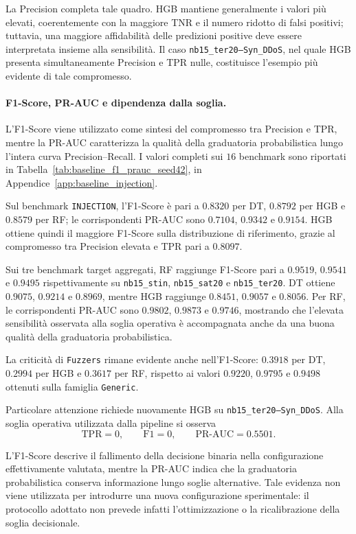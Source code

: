 La Precision completa tale quadro. 
HGB mantiene generalmente i valori più elevati, coerentemente con la maggiore TNR e il numero ridotto di falsi positivi; tuttavia, una maggiore affidabilità delle predizioni positive deve essere interpretata insieme alla sensibilità. 
Il caso \texttt{nb15\_ter20--Syn\_DDoS}, nel quale HGB presenta simultaneamente Precision e TPR nulle, costituisce l'esempio più evidente di tale compromesso.

\paragraph{F1-Score, PR-AUC e dipendenza dalla soglia.}
L'F1-Score viene utilizzato come sintesi del compromesso tra Precision e TPR, mentre la PR-AUC caratterizza la qualità della graduatoria probabilistica lungo l'intera curva Precision--Recall. 
I valori completi sui $16$ benchmark sono riportati in Tabella~\ref{tab:baseline_f1_prauc_seed42}, in Appendice~\ref{app:baseline_injection}.

Sul benchmark \texttt{INJECTION}, l'F1-Score è pari a $0.8320$ per DT, $0.8792$ per HGB e $0.8579$ per RF; le corrispondenti PR-AUC sono $0.7104$, $0.9342$ e $0.9154$. 
HGB ottiene quindi il maggiore F1-Score sulla distribuzione di riferimento, grazie al compromesso tra Precision elevata e TPR pari a $0.8097$.

Sui tre benchmark target aggregati, RF raggiunge F1-Score pari a $0.9519$, $0.9541$ e $0.9495$ rispettivamente su \texttt{nb15\_stin}, \texttt{nb15\_sat20} e \texttt{nb15\_ter20}. 
DT ottiene $0.9075$, $0.9214$ e $0.8969$, mentre HGB raggiunge $0.8451$, $0.9057$ e $0.8056$. 
Per RF, le corrispondenti PR-AUC sono $0.9802$, $0.9873$ e $0.9746$, mostrando che l'elevata sensibilità osservata alla soglia operativa è accompagnata anche da una buona qualità della graduatoria probabilistica.

La criticità di \texttt{Fuzzers} rimane evidente anche nell'F1-Score: $0.3918$ per DT, $0.2994$ per HGB e $0.3617$ per RF, rispetto ai valori $0.9220$, $0.9795$ e $0.9498$ ottenuti sulla famiglia \texttt{Generic}.

Particolare attenzione richiede nuovamente HGB su \texttt{nb15\_ter20--Syn\_DDoS}. 
Alla soglia operativa utilizzata dalla pipeline si osserva
\[
    \mathrm{TPR}=0,
    \qquad
    \mathrm{F1}=0,
    \qquad
    \mathrm{PR\text{-}AUC}=0.5501.
\]

L'F1-Score descrive il fallimento della decisione binaria nella configurazione effettivamente valutata, mentre la PR-AUC indica che la graduatoria probabilistica conserva informazione lungo soglie alternative. 
Tale evidenza non viene utilizzata per introdurre una nuova configurazione sperimentale: il protocollo adottato non prevede infatti l'ottimizzazione o la ricalibrazione della soglia decisionale.


